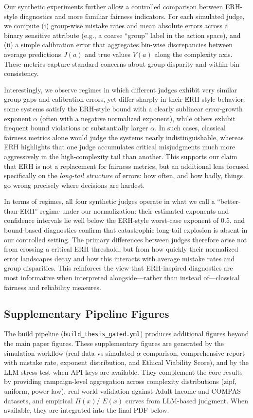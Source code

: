 \documentclass[12pt,a4paper]{article}
\theoremstyle{definition}
\theoremstyle{remark}
\begin{document}
Our synthetic experiments further allow a controlled comparison between ERH-style diagnostics and more familiar fairness indicators. For each simulated judge, we compute (i) group-wise mistake rates and mean absolute errors across a binary sensitive attribute (e.g., a coarse ``group'' label in the action space), and (ii) a simple calibration error that aggregates bin-wise discrepancies between average predictions $J(a)$ and true values $V(a)$ along the complexity axis. These metrics capture standard concerns about group disparity and within-bin consistency.

Interestingly, we observe regimes in which different judges exhibit very similar group gaps and calibration errors, yet differ sharply in their ERH-style behavior: some systems satisfy the ERH-style bound with a clearly sublinear error-growth exponent $\alpha$ (often with a negative normalized exponent), while others exhibit frequent bound violations or substantially larger $\alpha$. In such cases, classical fairness metrics alone would judge the systems nearly indistinguishable, whereas ERH highlights that one judge accumulates critical misjudgments much more aggressively in the high-complexity tail than another. This supports our claim that ERH is not a replacement for fairness metrics, but an additional lens focused specifically on the \emph{long-tail structure} of errors: how often, and how badly, things go wrong precisely where decisions are hardest.

In terms of regimes, all four synthetic judges operate in what we call a ``better-than-ERH'' regime under our normalization: their estimated exponents and confidence intervals lie well below the ERH-style worst-case exponent of $0.5$, and bound-based diagnostics confirm that catastrophic long-tail explosion is absent in our controlled setting. The primary differences between judges therefore arise not from crossing a critical ERH threshold, but from how quickly their normalized error landscapes decay and how this interacts with average mistake rates and group disparities. This reinforces the view that ERH-inspired diagnostics are most informative when interpreted alongside---rather than instead of---classical fairness and reliability measures.

\subsection{Supplementary Pipeline Figures}

The build pipeline (\texttt{build\_thesis\_gated.yml}) produces additional figures beyond the main paper figures. These supplementary figures are generated by the simulation workflow (real-data vs simulated $\alpha$ comparison, comprehensive report with mistake rate, exponent distribution, and Ethical Viability Score), and by the LLM stress test when API keys are available. They complement the core results by providing campaign-level aggregation across complexity distributions (zipf, uniform, power-law), real-world validation against Adult Income and COMPAS datasets, and empirical $\Pi(x)$/ $E(x)$ curves from LLM-based judgment. When available, they are integrated into the final PDF below.
\end{document}
